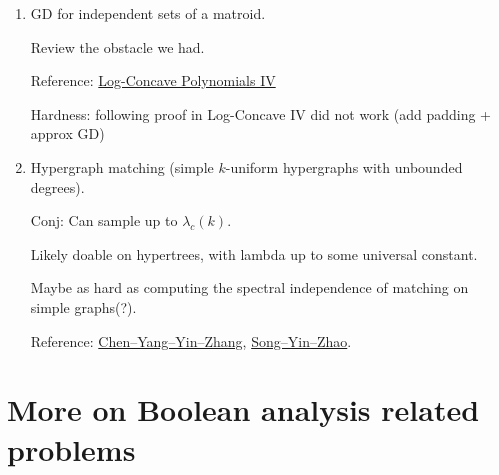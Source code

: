 \documentclass[11pt]{article}
\theoremstyle{plain}
\theoremstyle{definition}
\theoremstyle{remark}
\begin{document}
\begin{enumerate}
    \item GD for independent sets of a matroid. 

Review the obstacle we had.

Reference: \href{https://arxiv.org/pdf/2004.07220}{Log-Concave Polynomials IV}

Hardness: following proof in Log-Concave IV did not work (add padding + approx GD)

\item Hypergraph matching (simple $k$-uniform hypergraphs with unbounded degrees).

Conj: Can sample up to $\lambda_c(k)$.

Likely doable on hypertrees, with lambda up to some universal constant.

Maybe as hard as computing the spectral independence of matching on simple graphs(?).

Reference: \href{https://arxiv.org/pdf/2404.04668}{Chen--Yang--Yin--Zhang}, \href{https://arxiv.org/pdf/1503.05812}{Song--Yin--Zhao}.
\end{enumerate}


\section{More on Boolean analysis related problems}
\end{document}
